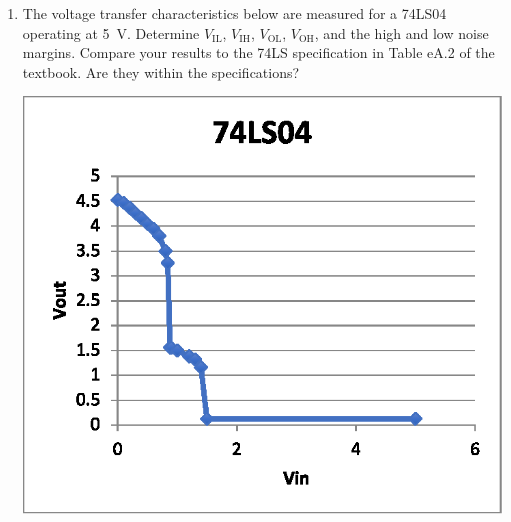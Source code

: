 \documentclass{e85}
\date{2019 January}
\author{}
\begin{document}
\begin{enumerate}
\item The voltage transfer characteristics below are measured for a
  74LS04 operating at \SI{5}{\V}.  Determine \(V_\mathrm{IL}\),
  \(V_\mathrm{IH}\), \(V_\mathrm{OL}\), \(V_\mathrm{OH}\), and the
  high and low noise margins.  Compare your results to the 74LS
  specification in Table eA.2 of the textbook.  Are they within the
  specifications?
  \begin{center}
    \includegraphics{figures/01.eps}
  \end{center}
  \begin{solution}
  \end{solution}


\end{enumerate}
\end{document}
